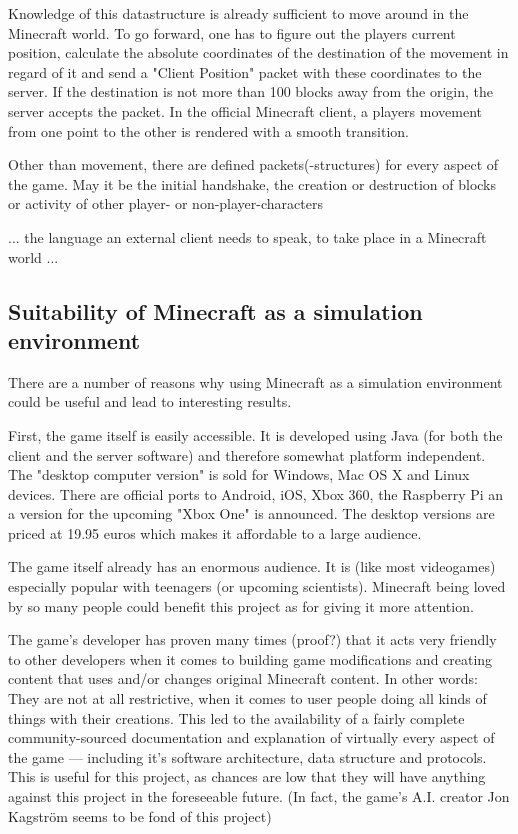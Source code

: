 Knowledge of this datastructure is already sufficient to move around in the Minecraft world. To go forward, one has to figure out the players current position, calculate the absolute coordinates of the destination of the movement in regard of it and send a "Client Position" packet with these coordinates to the server. If the destination is not more than 100 blocks away from the origin, the server accepts the packet. In the official Minecraft client, a players movement from one point to the other is rendered with a smooth transition.

Other than movement, there are defined packets(-structures) for every aspect of the game. May it be the initial handshake, the creation or destruction of blocks or activity of other player- or non-player-characters

... the language an external client needs to speak, to take place in a Minecraft world ...

        \subsection{Suitability of Minecraft as a simulation environment}
There are a number of reasons why using Minecraft as a simulation environment could be useful and lead to interesting results.

First, the game itself is easily accessible. It is developed using Java (for both the client and the server software) and therefore somewhat platform independent. The "desktop computer version" is sold for Windows, Mac OS X and Linux devices. There are official ports to Android, iOS, Xbox 360, the Raspberry Pi an a version for the upcoming "Xbox One" is announced. The desktop versions are priced at 19.95 euros  which makes it affordable to a large audience.

The game itself already has an enormous audience. It is (like most videogames) especially popular with teenagers (or upcoming scientists). Minecraft being loved by so many people could benefit this project as for giving it more attention.

The game's developer has proven many times (proof?) that it acts very friendly to other developers when it comes to building game modifications and creating content that uses and/or changes original Minecraft content. In other words: They are not at all restrictive, when it comes to user people doing all kinds of things with their creations. This led to the availability of a fairly complete community-sourced  documentation and explanation of virtually every aspect of the game --- including it's software architecture, data structure and protocols. This is useful for this project, as chances are low that they will have anything against this project in the foreseeable future. (In fact, the game's A.I. creator Jon Kagström seems to be fond of this project)


